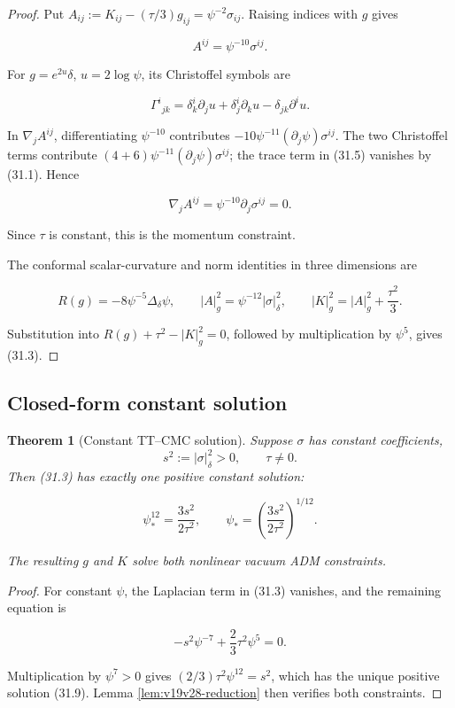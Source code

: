 \documentclass[11pt]{article}
\newtheorem{theorem}{Theorem}[section]
\theoremstyle{remark}
\begin{document}
\begin{proof}
Put \(A_{ij}:=K_{ij}-(\tau/3)g_{ij}=\psi^{-2}\sigma_{ij}\).
Raising indices with \(g\) gives

\[
 A^{ij}=\psi^{-10}\sigma^{ij}.                                \tag{31.4}
\]

For \(g=e^{2u}\delta\), \(u=2\log\psi\), its Christoffel symbols are

\[
 \Gamma^i{}_{jk}
 =\delta^i_k\partial_ju+\delta^i_j\partial_ku
  -\delta_{jk}\partial^iu.                                   \tag{31.5}
\]

In \(\nabla_jA^{ij}\), differentiating \(\psi^{-10}\) contributes
\(-10\psi^{-11}(\partial_j\psi)\sigma^{ij}\).  The two Christoffel
terms contribute
\((4+6)\psi^{-11}(\partial_j\psi)\sigma^{ij}\); the trace term in
(31.5) vanishes by (31.1).  Hence

\[
 \nabla_jA^{ij}=\psi^{-10}\partial_j\sigma^{ij}=0.             \tag{31.6}
\]

Since \(\tau\) is constant, this is the momentum constraint.

The conformal scalar-curvature and norm identities in three dimensions
are

\[
 R(g)=-8\psi^{-5}\Delta_\delta\psi,\qquad
 |A|_g^2=\psi^{-12}|\sigma|_\delta^2,\qquad
 |K|_g^2=|A|_g^2+\frac{\tau^2}{3}.                            \tag{31.7}
\]

Substitution into
\(R(g)+\tau^2-|K|_g^2=0\), followed by multiplication by \(\psi^5\),
gives (31.3).
\end{proof}

\subsection{Closed-form constant solution}

\begin{theorem}[Constant TT--CMC solution]
\label{thm:v19v28-constant}
Suppose \(\sigma\) has constant coefficients,
\[
 s^2:=|\sigma|_\delta^2>0,\qquad \tau\neq0.                   \tag{31.8}
\]
Then (31.3) has exactly one positive constant solution:

\[
 \psi_*^{12}=\frac{3s^2}{2\tau^2},
 \qquad
 \psi_*=\left(\frac{3s^2}{2\tau^2}\right)^{1/12}.             \tag{31.9}
\]

The resulting \(g\) and \(K\) solve both nonlinear vacuum ADM
constraints.
\end{theorem}

\begin{proof}
For constant \(\psi\), the Laplacian term in (31.3) vanishes, and the
remaining equation is

\[
 -s^2\psi^{-7}+\frac23\tau^2\psi^5=0.                         \tag{31.10}
\]

Multiplication by \(\psi^7>0\) gives
\((2/3)\tau^2\psi^{12}=s^2\), which has the unique positive solution
(31.9).  Lemma \ref{lem:v19v28-reduction} then verifies both constraints.
\end{proof}
\end{document}
